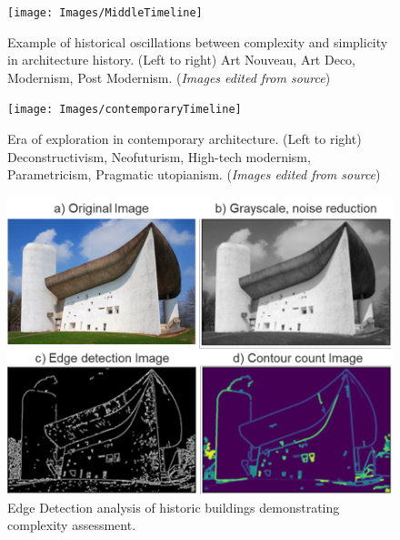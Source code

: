     \begin{figure}[htb]
    \centering
    \texttt{[image: Images/MiddleTimeline]}
    \caption{Example of historical oscillations between complexity and simplicity in architecture history. (Left to right) Art Nouveau, Art Deco, Modernism, Post Modernism. (\textit{Images edited from source})}
    \label{fig:Middletimeline}
    \end{figure}

    \begin{figure}[htb]
    \centering
    \texttt{[image: Images/contemporaryTimeline]}
    \caption{Era of exploration in contemporary architecture. (Left to right) Deconstructivism, Neofuturism, High-tech modernism, Parametricism, Pragmatic utopianism. (\textit{Images edited from source})}
    \label{fig:contemporarytimeline}
    \end{figure}

    \begin{figure}[htb]
    \centering
    \includegraphics[width= \linewidth]{Images/CICAHistoryPlot}
    \caption{Edge Detection analysis of historic buildings demonstrating complexity assessment.}
    \label{fig:ComplexityPlotHistory}
    \end{figure}


